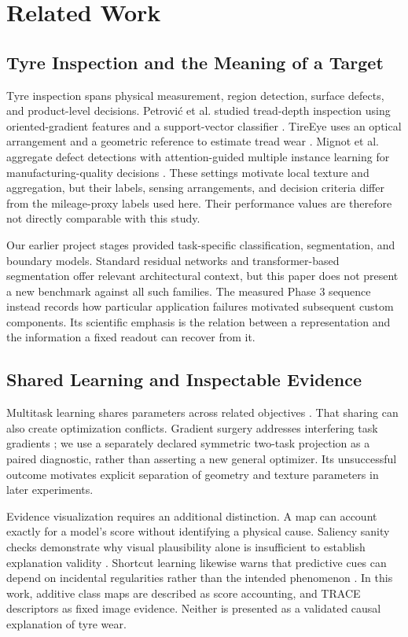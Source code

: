 \section{Related Work}\label{sec:related}
\subsection{Tyre Inspection and the Meaning of a Target}
Tyre inspection spans physical measurement, region detection, surface defects, and product-level decisions. Petrovi\'{c} et al. studied tread-depth inspection using oriented-gradient features and a support-vector classifier \cite{tread2021}. TireEye uses an optical arrangement and a geometric reference to estimate tread wear \cite{tireeye}. Mignot et al. aggregate defect detections with attention-guided multiple instance learning for manufacturing-quality decisions \cite{mil2025}. These settings motivate local texture and aggregation, but their labels, sensing arrangements, and decision criteria differ from the mileage-proxy labels used here. Their performance values are therefore not directly comparable with this study.

Our earlier project stages provided task-specific classification, segmentation, and boundary models. Standard residual networks \cite{resnet} and transformer-based segmentation \cite{segformer} offer relevant architectural context, but this paper does not present a new benchmark against all such families. The measured Phase 3 sequence instead records how particular application failures motivated subsequent custom components. Its scientific emphasis is the relation between a representation and the information a fixed readout can recover from it.

\subsection{Shared Learning and Inspectable Evidence}
Multitask learning shares parameters across related objectives \cite{caruana}. That sharing can also create optimization conflicts. Gradient surgery addresses interfering task gradients \cite{pcgrad}; we use a separately declared symmetric two-task projection as a paired diagnostic, rather than asserting a new general optimizer. Its unsuccessful outcome motivates explicit separation of geometry and texture parameters in later experiments.

Evidence visualization requires an additional distinction. A map can account exactly for a model's score without identifying a physical cause. Saliency sanity checks demonstrate why visual plausibility alone is insufficient to establish explanation validity \cite{sanity}. Shortcut learning likewise warns that predictive cues can depend on incidental regularities rather than the intended phenomenon \cite{shortcuts}. In this work, additive class maps are described as score accounting, and TRACE descriptors as fixed image evidence. Neither is presented as a validated causal explanation of tyre wear.

